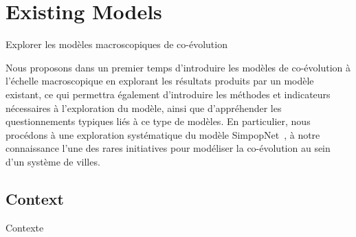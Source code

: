 




\newpage


\section{Existing Models}{Explorer les modèles macroscopiques de co-évolution}

\label{sec:macrocoevolexplo}



Nous proposons dans un premier temps d'introduire les modèles de co-évolution à l'échelle macroscopique en explorant les résultats produits par un modèle existant, ce qui permettra également d'introduire les méthodes et indicateurs nécessaires à l'exploration du modèle, ainsi que d'appréhender les questionnements typiques liés à ce type de modèles. En particulier, nous procédons à une exploration systématique du modèle SimpopNet~\cite{schmitt2014modelisation}, à notre connaissance l'une des rares initiatives pour modéliser la co-évolution au sein d'un système de villes.



\subsection{Context}{Contexte}


